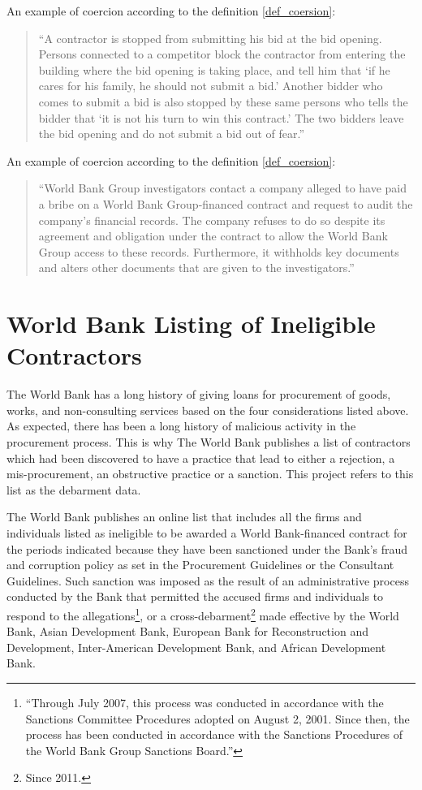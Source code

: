 An example of coercion according to the definition \ref{def_coersion}: \begin{quote}
``A contractor is stopped from submitting his bid at the bid opening.  Persons connected to a competitor block the contractor from entering the building where the bid opening is taking place, and tell him that `if he cares for his family, he should not submit a bid.'  Another bidder who comes to submit a bid is also stopped by these same persons who tells the bidder that `it is not his turn to win this contract.'  The two bidders leave the bid opening and do not submit a bid out of fear.''\parencite{wb_examples}
\end{quote}


An example of coercion according to the definition \ref{def_coersion}: \begin{quote}
``World Bank Group investigators contact a company alleged to have paid a bribe on a World Bank Group-financed contract and request to audit the company's financial records.  The company refuses to do so despite its agreement and obligation under the contract to allow the World Bank Group access to these records.  Furthermore, it withholds key documents and alters other documents that are given to the investigators.''\parencite{wb_examples}
\end{quote}


\section{World Bank Listing of Ineligible Contractors}

The World Bank has a long history of giving loans for procurement of goods, works, and non-consulting services based on the four considerations listed above. As expected, there has been a long history of malicious activity in the procurement process. This is why The World Bank publishes a list of contractors which had been discovered to have a practice that lead to either a rejection, a mis-procurement, an obstructive practice or a sanction. This project refers to this list as the debarment data.

The World Bank publishes an online \parencite{wb_debarment} list that includes all the firms and individuals listed as ineligible to be awarded a World Bank-financed contract for the periods indicated because they have been sanctioned under the Bank's fraud and corruption policy as set in the Procurement Guidelines or the Consultant Guidelines.  Such sanction was imposed as the result of an administrative process conducted by the Bank that permitted the accused firms and individuals to respond to the allegations\footnote{``Through July 2007, this process was conducted in accordance with the Sanctions Committee Procedures adopted on August 2, 2001. Since then, the process has been conducted in accordance with the Sanctions Procedures of the World Bank Group Sanctions Board.''}, or a cross-debarment\footnote{ Since 2011.} made effective by the World Bank, Asian Development Bank, European Bank for Reconstruction and Development, Inter-American Development Bank, and African Development Bank.

